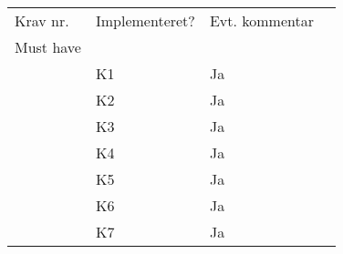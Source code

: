 \documentclass[class=article, crop=false]{standalone}
\begin{document}
    \begin{table}[]
        \begin{tabular}{llll}
            Krav nr.        & Implementeret? & Evt. kommentar     &                                                                                                                                                                                                    \\
            Must have       &                &                    &                                                                                                                                                                                                    \\
            & K1             & Ja                 &                                                                                                                                                                                                    \\
            & K2             & Ja                 &                                                                                                                                                                                                    \\
            & K3             & Ja                 &                                                                                                                                                                                                    \\
            & K4             & Ja                 &                                                                                                                                                                                                    \\
            & K5             & Ja                 &                                                                                                                                                                                                    \\
            & K6             & Ja                 &                                                                                                                                                                                                    \\
            & K7             & Ja                 &                                                                                                                                                                                                    \\

\end{tabular}
\end{table}
\end{document}

